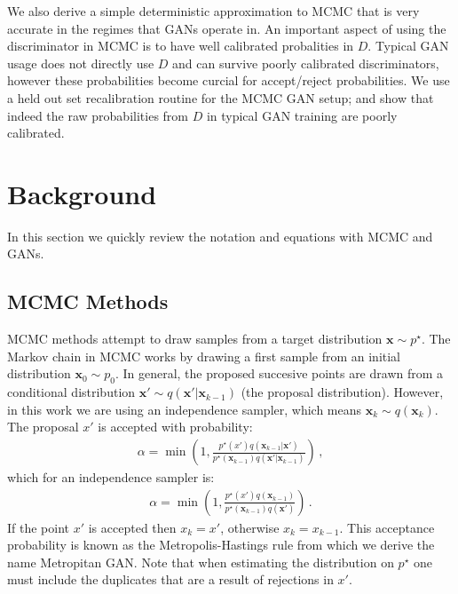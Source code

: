 \documentclass{article}
\renewcommand{\vec}[1]{{\boldsymbol{\mathbf{#1}}}} %
\newcommand{\sample}{\sim}
\newcommand{\given}{|}
\newcommand{\target}{{p^\star}}
\newcommand{\prop}{q}
\newcommand{\pinit}{{p_0}}
\begin{document}
We also derive a simple deterministic approximation to MCMC that is very accurate in the regimes that GANs operate in.
An important aspect of using the discriminator in MCMC is to have well calibrated probalities in $D$.
Typical GAN usage does not directly use $D$ and can survive poorly calibrated discriminators, however these probabilities become curcial for accept/reject probabilities.
We use a held out set recalibration routine for the MCMC GAN setup; and show that indeed the raw probabilities from $D$ in typical GAN training are poorly calibrated.

\section{Background}

In this section we quickly review the notation and equations with MCMC and GANs.

\subsection{MCMC Methods}

MCMC methods attempt to draw samples from a target distribution $\vec x \sample \target$.
The Markov chain in MCMC works by drawing a first sample from an initial distribution $\vec x_0 \sample \pinit$.
In general, the proposed succesive points are drawn from a conditional distribution $\vec x' \sample \prop(\vec x' \given \vec x_{k-1})$ (the proposal distribution)\@.
However, in this work we are using an independence sampler, which means $\vec x_k \sample \prop(\vec x_k)$.
The proposal $x'$ is accepted with probability:
\begin{align}
  \alpha = \min\left(1, \frac{\target(x')\prop(\vec x_{k-1} \given \vec x')}{\target(\vec x_{k-1})\prop(\vec x' \given \vec x_{k-1})}\right)\,,
\end{align}
which for an independence sampler is:
\begin{align}
  \alpha = \min\left(1, \frac{\target(x')\prop(\vec x_{k-1})}{\target(\vec x_{k-1})\prop(\vec x')}\right)\,.
\end{align}
If the point $x'$ is accepted then $x_k = x'$, otherwise $x_k = x_{k-1}$.
This acceptance probability is known as the Metropolis-Hastings rule from which we derive the name Metropitan GAN\@.
Note that when estimating the distribution on $\target$ one must include the duplicates that are a result of rejections in $x'$.
\end{document}
